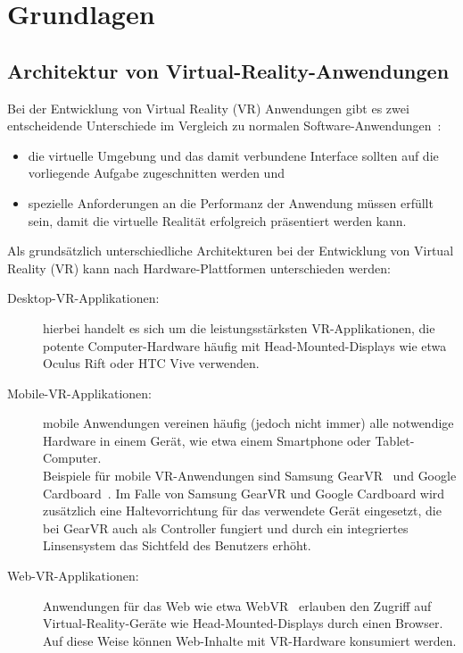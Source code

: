 \section{Grundlagen}
\subsection{Architektur von Virtual-Reality-Anwendungen}\label{sec:ArchitekturAnwendungen}
Bei der Entwicklung von Virtual Reality (VR) Anwendungen gibt es zwei entscheidende Unterschiede im Vergleich zu normalen Software-Anwendungen~\cite{bryson1995approaches}:
\begin{itemize}
	\item die virtuelle Umgebung und das damit verbundene Interface sollten auf die vorliegende Aufgabe zugeschnitten werden und
	\item spezielle Anforderungen an die Performanz der Anwendung müssen erfüllt sein, damit die virtuelle Realität erfolgreich präsentiert werden kann.
\end{itemize}

Als grundsätzlich unterschiedliche Architekturen bei der Entwicklung von Virtual Reality (VR) kann nach Hardware-Plattformen unterschieden werden:
\begin{description}
	\item[Desktop-VR-Applikationen:] hierbei handelt es sich um die leistungsstärksten VR-Applikationen, die potente Computer-Hardware häufig mit Head-Mounted-Displays wie etwa Oculus Rift oder HTC Vive verwenden.
	\item[Mobile-VR-Applikationen:] mobile Anwendungen vereinen häufig (jedoch nicht immer) alle notwendige Hardware in einem Gerät, wie etwa einem Smartphone oder Tablet-Computer.\\ Beispiele für mobile VR-Anwendungen sind Samsung GearVR~\cite{website:gearVRpressRelease} und Google Cardboard~\cite{website:googleCardboard}. Im Falle von Samsung GearVR und Google Cardboard wird zusätzlich eine Haltevorrichtung für das verwendete Gerät eingesetzt, die bei GearVR auch als Controller fungiert und durch ein integriertes Linsensystem das Sichtfeld des Benutzers erhöht.
	\item[Web-VR-Applikationen:] Anwendungen für das Web wie etwa WebVR~\cite{website:webVR} erlauben den Zugriff auf Virtual-Reality-Geräte wie Head-Mounted-Displays durch einen Browser. Auf diese Weise können Web-Inhalte mit VR-Hardware konsumiert werden.
\end{description}

